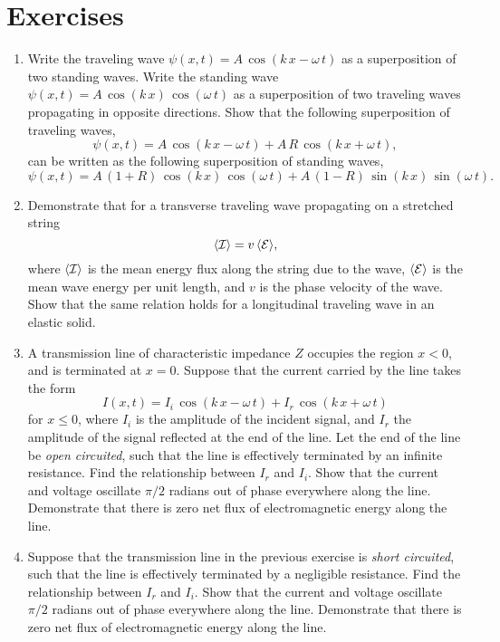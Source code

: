 \section{Exercises}
{\small
\begin{enumerate}
\item Write the traveling wave $\psi(x,t)= A\,\cos(k\,x-\omega\,t)$ as a
superposition of two standing waves. Write the standing wave $\psi(x,t)=A\,\cos(k\,x)\,\cos(\omega\,t)$ as a superposition of two traveling waves propagating in
opposite directions. Show that the following superposition of
traveling waves,
$$
\psi(x,t)= A\,\cos(k\,x-\omega\,t)+ A\,R\,\cos(k\,x+\omega\,t),
$$
can be written as the following superposition of standing waves,
$$
\psi(x,t) = A\,(1+R)\,\cos(k\,x)\,\cos(\omega\,t) + A\,(1-R)\,\sin(k\,x)\,\sin(\omega\,t).
$$

\item Demonstrate that for a transverse traveling wave propagating on a stretched
string
$$
\langle {\cal I}\rangle = v\,\langle {\cal E}\rangle,
$$
where $\langle {\cal I}\rangle$ is the mean energy flux along the string due to the
wave, $\langle {\cal E}\rangle$ is the mean wave energy per unit length, and $v$ is the
phase velocity of the wave. Show that the same relation holds for a longitudinal traveling wave in an elastic solid. 

\item A transmission line of characteristic impedance $Z$ occupies the region $x<0$, and is terminated at $x=0$. 
Suppose that the current carried by the line takes the form
$$
I(x,t) = I_i\,\cos(k\,x-\omega\,t)+ I_r\,\cos(k\,x+\omega\,t)
$$
for $x\leq 0$,
where $I_i$ is the amplitude of the incident signal, and $I_r$ the amplitude
of the signal reflected at the end of the line. Let the end
of the line be {\em open circuited}, such that the line is effectively terminated by an
infinite resistance. Find the relationship between $I_r$ and $I_i$.
Show that the current and voltage oscillate $\pi/2$ radians  out of phase everywhere along the line. Demonstrate that there is zero net flux of
electromagnetic energy along the line. 

\item Suppose that the transmission line in the previous exercise is {\em short
circuited}, such that the line is effectively terminated by a negligible resistance.
Find the relationship between $I_r$ and $I_i$. Show that the current and voltage oscillate $\pi/2$ radians out of phase everywhere along the line. Demonstrate that there is zero net flux of
electromagnetic energy along the line. 


\end{enumerate}}
